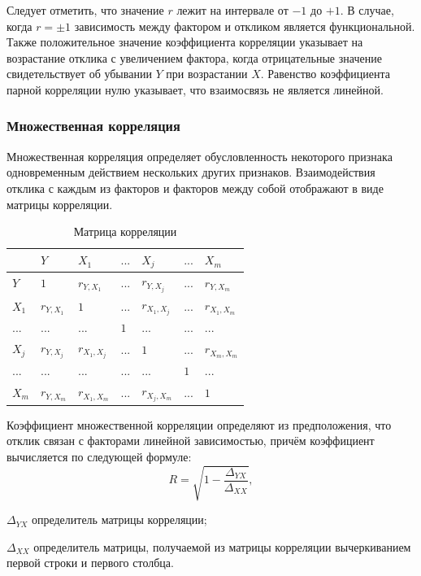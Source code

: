 Следует отметить, что значение $r$ лежит на интервале от $-1$ до $+1$. В случае, когда $r=\pm1$ зависимость между фактором и откликом является функциональной. Также положительное значение коэффициента корреляции указывает на возрастание отклика с увеличением фактора, когда отрицательные значение свидетельствует об убывании $Y$ при возрастании $X$. Равенство коэффициента парной корреляции нулю указывает, что взаимосвязь не является линейной. \cite{corelMethod}

\subsubsection{Множественная корреляция}
Множественная корреляция определяет обусловленность некоторого признака одновременным действием нескольких других признаков. Взаимодействия отклика с каждым из факторов и факторов между собой отображают в виде матрицы корреляции. \cite{corelMethod}

\begin{table}[H]
\begin{center}
\caption{\label{table: corelMatrix} Матрица корреляции}
\begin{tabular}{l||llllll}
      & $Y$         & $X_1$         & $...$ & $X_j$          & $...$ & $X_m$             \\ \hline\hline
$Y$   & $1$         & $r_{Y,X_1}$   & $...$ & $r_{Y,X_j}$    & $...$ & $r_{Y,X_m}$    \\
$X_1$ & $r_{Y,X_1}$ & $1 $          & $...$ & $r_{X_1,X_j}$  & $...$ & $r_{X_1,X_m}$ \\
$...$ & $...$       & $...$         & $1$   & $...$          & $...$ & $...$              \\
$X_j$ & $r_{Y,X_j}$ & $r_{X_1,X_j}$ & $...$ & $1$            & $...$ & $r_{X_m,X_m}$ \\
$...$ & $...$       & $...$         & $...$ & $...$          & $1$   & $...$              \\
$X_m$ & $r_{Y,X_m}$ & $r_{X_1,X_m}$ & $...$ & $r_{X_j,X_m}$  & $...$ & $1$               
\end{tabular}
\end{center}
\end{table}

Коэффициент множественной корреляции определяют из предположения, что отклик связан с факторами линейной зависимостью, причём коэффициент вычисляется по следующей формуле:
\begin{equation}
\label{eq:fuckMark}
R = \sqrt{1 - \frac{\Delta_{YX}}{\Delta_{XX}}},
\end{equation}
\begin{eqexpl}[15mm]
\item{$\Delta_{YX}$} определитель матрицы корреляции;
\item{$\Delta_{XX}$} определитель матрицы, получаемой из матрицы корреляции вычеркиванием первой строки и первого столбца.
\end{eqexpl}

